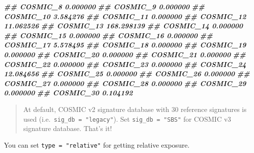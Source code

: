 \documentclass[
  12pt,
  a4paper,
  twoside]{book}
\newenvironment{Shaded}{\begin{snugshade}}{\end{snugshade}}
\newcommand{\DocumentationTok}[1]{\textcolor[rgb]{0.56,0.35,0.01}{\textbf{\textit{#1}}}}
\begin{document}
\begin{Shaded}
\begin{Highlighting}[]
\DocumentationTok{\#\# COSMIC\_8                      0.000000}
\DocumentationTok{\#\# COSMIC\_9                      0.000000}
\DocumentationTok{\#\# COSMIC\_10                     3.584276}
\DocumentationTok{\#\# COSMIC\_11                     0.000000}
\DocumentationTok{\#\# COSMIC\_12                    11.062526}
\DocumentationTok{\#\# COSMIC\_13                   168.298139}
\DocumentationTok{\#\# COSMIC\_14                     0.000000}
\DocumentationTok{\#\# COSMIC\_15                     0.000000}
\DocumentationTok{\#\# COSMIC\_16                     0.000000}
\DocumentationTok{\#\# COSMIC\_17                     5.578495}
\DocumentationTok{\#\# COSMIC\_18                     0.000000}
\DocumentationTok{\#\# COSMIC\_19                     0.000000}
\DocumentationTok{\#\# COSMIC\_20                     0.000000}
\DocumentationTok{\#\# COSMIC\_21                     0.000000}
\DocumentationTok{\#\# COSMIC\_22                     0.000000}
\DocumentationTok{\#\# COSMIC\_23                     0.000000}
\DocumentationTok{\#\# COSMIC\_24                    12.084656}
\DocumentationTok{\#\# COSMIC\_25                     0.000000}
\DocumentationTok{\#\# COSMIC\_26                     0.000000}
\DocumentationTok{\#\# COSMIC\_27                     0.000000}
\DocumentationTok{\#\# COSMIC\_28                     0.000000}
\DocumentationTok{\#\# COSMIC\_29                     0.000000}
\DocumentationTok{\#\# COSMIC\_30                     0.104192}
\end{Highlighting}
\end{Shaded}

\begin{quote}
At default, COSMIC v2 signature database with 30 reference signatures is used (i.e.~\texttt{sig\_db\ =\ "legacy"}). Set \texttt{sig\_db\ =\ "SBS"} for COSMIC v3 signature database.
That's it!
\end{quote}

You can set \texttt{type\ =\ "relative"} for getting relative exposure.
\end{document}
